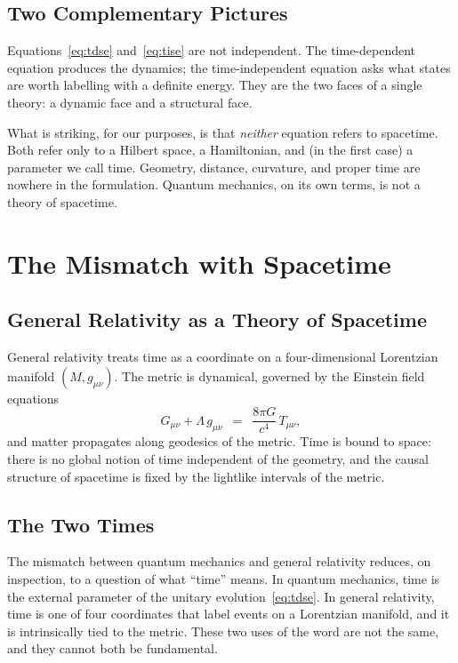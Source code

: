 \documentclass[11pt]{article}
\begin{document}
\subsection{Two Complementary Pictures}

Equations~\eqref{eq:tdse} and~\eqref{eq:tise} are not independent. The time-dependent equation produces the dynamics; the time-independent equation asks what states are worth labelling with a definite energy. They are the two faces of a single theory: a dynamic face and a structural face.

What is striking, for our purposes, is that \emph{neither} equation refers to spacetime. Both refer only to a Hilbert space, a Hamiltonian, and (in the first case) a parameter we call time. Geometry, distance, curvature, and proper time are nowhere in the formulation. Quantum mechanics, on its own terms, is not a theory of spacetime.

\section{The Mismatch with Spacetime}
\label{sec:mismatch}

\subsection{General Relativity as a Theory of Spacetime}

General relativity treats time as a coordinate on a four-dimensional Lorentzian manifold $(M, g_{\mu\nu})$. The metric is dynamical, governed by the Einstein field equations
\begin{equation}
G_{\mu\nu} + \Lambda\,g_{\mu\nu} \;\:=\;\: \frac{8\pi G}{c^{4}}\,T_{\mu\nu},
\label{eq:efe}
\end{equation}
and matter propagates along geodesics of the metric. Time is bound to space: there is no global notion of time independent of the geometry, and the causal structure of spacetime is fixed by the lightlike intervals of the metric.

\subsection{The Two Times}

The mismatch between quantum mechanics and general relativity reduces, on inspection, to a question of what ``time'' means. In quantum mechanics, time is the external parameter of the unitary evolution~\eqref{eq:tdse}. In general relativity, time is one of four coordinates that label events on a Lorentzian manifold, and it is intrinsically tied to the metric. These two uses of the word are not the same, and they cannot both be fundamental.
\end{document}
